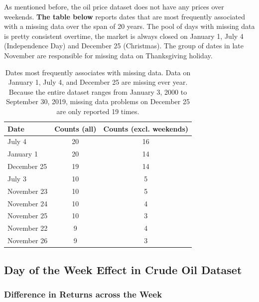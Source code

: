 \documentclass[12pt]{article}
\begin{document}
	\par As mentioned before, the oil price dataset does not have any prices over weekends. \textbf{The table below} reports dates that are most frequently associated with a missing data over the span of 20 years. The pool of days with missing data is pretty consistent overtime, the market is always closed on January 1, July 4 (Independence Day) and December 25 (Christmas). The group of dates in late November are responsible for missing data on Thanksgiving holiday.
	\begin{table}[H]
		\small
		\centering
		\begin{tabular}{l|c c}
			\toprule
			Date & Counts (all) & Counts (excl. weekends) \\
			\midrule
			July 4 & 20 & 16 \\
			January 1 & 20 & 14 \\
			December 25 & 19 & 14 \\
			July 3 & 10 & 5 \\
			November 23 & 10 & 5 \\
			November 24 & 10 & 4\\
			November 25 & 10 & 3\\
			November 22 & 9 & 4 \\
			November 26 & 9 & 3 \\
			\bottomrule
		\end{tabular}
		\caption{Dates most frequently associates with missing data. Data on January 1, July 4, and December 25 are missing ever year. Because the entire dataset ranges from January 3, 2000 to September 30, 2019, missing data problems on December 25 are only reported 19 times.}
	\end{table}
 
	\subsection{Day of the Week Effect in Crude Oil Dataset}
	\subsubsection{Difference in Returns across the Week}
\end{document}
